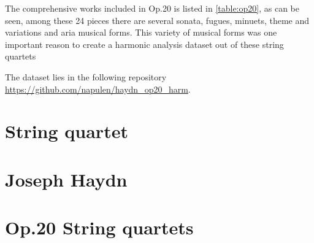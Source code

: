 The comprehensive works included in Op.20 is listed in \autoref{table:op20}, as can be seen, among these 24 pieces there are several sonata, fugues, minuets, theme and variations and aria musical forms. This variety of musical forms was one important reason to create a harmonic analysis dataset out of these string quartets



The dataset lies in the following repository \url{https://github.com/napulen/haydn_op20_harm}.

\section{String quartet}

\section{Joseph Haydn}

\section{Op.20 String quartets}

\newpage
